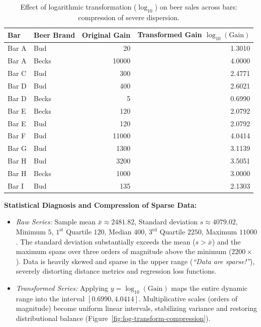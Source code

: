\begin{itemize}
\begin{example}
    \begin{table}[H]
    \centering
    \small
    \begin{tabular}{llrr}
    \toprule
    \textbf{Bar} & \textbf{Beer Brand} & \textbf{Original Gain} & \textbf{Transformed Gain } $\log_{10}(\text{Gain})$ \\
    \midrule
    Bar A & Bud   & 20    & 1.3010 \\
    Bar A & Becks & 10000 & 4.0000 \\
    Bar C & Bud   & 300   & 2.4771 \\
    Bar D & Bud   & 400   & 2.6021 \\
    Bar D & Becks & 5     & 0.6990 \\
    Bar E & Becks & 120   & 2.0792 \\
    Bar E & Bud   & 120   & 2.0792 \\
    Bar F & Bud   & 11000 & 4.0414 \\
    Bar G & Bud   & 1300  & 3.1139 \\
    Bar H & Bud   & 3200  & 3.5051 \\
    Bar H & Becks & 1000  & 3.0000 \\
    Bar I & Bud   & 135   & 2.1303 \\
    \bottomrule
    \end{tabular}
    \caption{Effect of logarithmic transformation ($\log_{10}$) on beer sales across bars: compression of severe dispersion.}
    \label{tab:bar-beer-gain}
    \end{table}

    \textbf{Statistical Diagnosis and Compression of Sparse Data:}
    \begin{itemize}
        \item \textit{Raw Series:} Sample mean $\bar{x} \approx 2481.82$, Standard deviation $s \approx 4079.02$, Minimum $5$, $1^{\text{st}}$ Quartile $120$, Median $400$, $3^{\text{rd}}$ Quartile $2250$, Maximum $11000$. The standard deviation substantially exceeds the mean ($s > \bar{x}$) and the maximum spans over three orders of magnitude above the minimum ($2200 \times$). Data is heavily skewed and sparse in the upper range (\textit{``Data are sparse!''}), severely distorting distance metrics and regression loss functions.
        \item \textit{Transformed Series:} Applying $y = \log_{10}(\text{Gain})$ maps the entire dynamic range into the interval $[0.6990, 4.0414]$. Multiplicative scales (orders of magnitude) become uniform linear intervals, stabilizing variance and restoring distributional balance (Figure~\ref{fig:log-transform-compression}).
    \end{itemize}
    \end{example}


\end{itemize}
